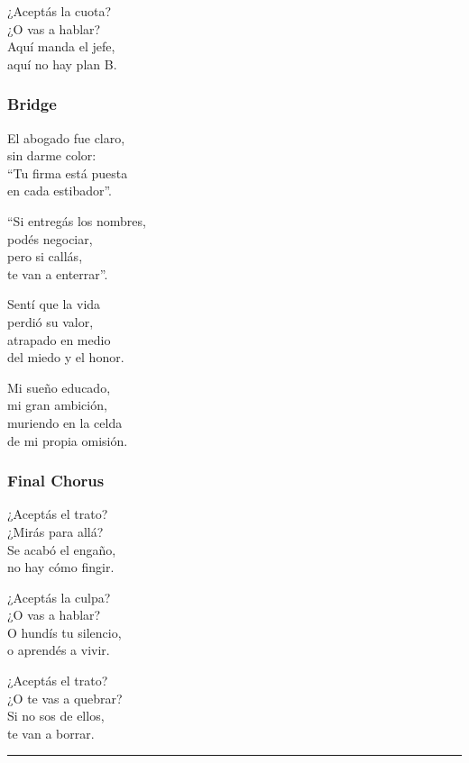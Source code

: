 ¿Aceptás la cuota?\\
¿O vas a hablar?\\
Aquí manda el jefe,\\
aquí no hay plan B.

\subsubsection{Bridge}\label{bridge-19}

El abogado fue claro,\\
sin darme color:\\
``Tu firma está puesta\\
en cada estibador''.

``Si entregás los nombres,\\
podés negociar,\\
pero si callás,\\
te van a enterrar''.

Sentí que la vida\\
perdió su valor,\\
atrapado en medio\\
del miedo y el honor.

Mi sueño educado,\\
mi gran ambición,\\
muriendo en la celda\\
de mi propia omisión.

\subsubsection{Final Chorus}\label{final-chorus}

¿Aceptás el trato?\\
¿Mirás para allá?\\
Se acabó el engaño,\\
no hay cómo fingir.

¿Aceptás la culpa?\\
¿O vas a hablar?\\
O hundís tu silencio,\\
o aprendés a vivir.

¿Aceptás el trato?\\
¿O te vas a quebrar?\\
Si no sos de ellos,\\
te van a borrar.

\begin{center}\rule{0.5\linewidth}{0.5pt}\end{center}


